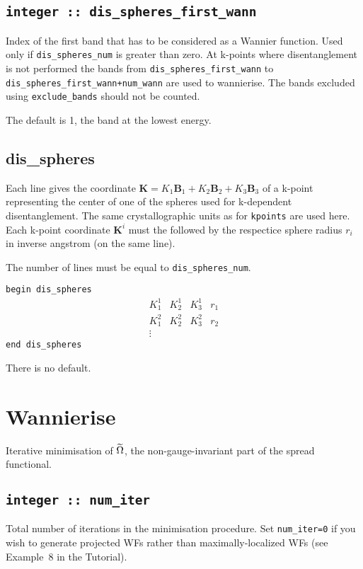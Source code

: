 \subsection[dis\_spheres\_first\_wann]{\tt integer :: dis\_spheres\_first\_wann}
Index of the first band that has to be considered as a Wannier function. Used only if {\tt dis\_spheres\_num} is greater than zero.
At k-points where disentanglement is not performed the bands from
{\tt dis\_spheres\_first\_wann} to {\tt dis\_spheres\_first\_wann+num\_wann} are used
to wannierise. The bands excluded using {\tt exclude\_bands} should not
be counted.

The default is 1, the band at the lowest energy.


\subsection[dis\_spheres]{dis\_spheres}
Each line gives the coordinate $\mathbf{K}=K_1 \mathbf{B}_{1} + K_2
\mathbf{B}_{2} + K_3 \mathbf{B}_3$ of a k-point representing the
center of one of the spheres used for k-dependent disentanglement.
The same crystallographic units as for {\tt kpoints} are used here.
Each k-point coordinate $\mathbf{K}^i$ must the followed by the
respectice sphere radius $r_{i}$ in inverse angstrom (on the same line).

The number of lines must be equal to {\tt dis\_spheres\_num}.

\noindent  \verb#begin dis_spheres#
$$
\begin{array}{cccc}
 K^{1}_{1} & K^{1}_{2} & K^{1}_{3} & r_{1} \\
 K^{2}_{1} & K^{2}_{2} & K^{2}_{3} & r_{2} \\
\vdots
\end{array}
$$
\verb#end dis_spheres#

There is no default.


\section{Wannierise}\label{sec:wann_params}
Iterative minimisation of $\widetilde{\Omega}$, the non-gauge-invariant part of the
spread functional.

\subsection[num\_iter]{\tt integer :: num\_iter}

Total number of iterations in the minimisation procedure.
Set {\tt num\_iter=0} if you wish to generate
  projected WFs rather than maximally-localized WFs (see Example~8 in
  the Tutorial).


